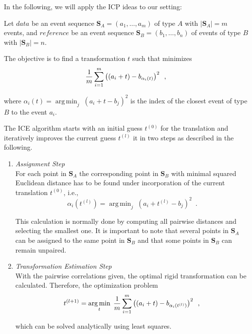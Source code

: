 \documentclass[conference]{IEEEtran}
\theoremstyle{examplestyle}
\DeclareMathOperator*{\argmin}{arg\,min}
\begin{document}
In the following, we will apply the ICP ideas to our setting:

Let \(data\) be  an event sequence \(\pmb{S}_A = (a_1,\ldots, a_m)\)   of type \(A\) with \(|\pmb{S}_A| = m\) events,  and \(reference\) be an event sequence \(\pmb{S}_B=(b_1,\ldots, b_n)\)  of events of type \(B\) with \(|\pmb{S}_B| = n\).

The objective is to find a transformation $t$ such that minimizes 
\begin{equation}
 \dfrac{1}{m} \sum_{i = 1}^{m} \left( (a_i + t) - b_{\alpha_i(t)} \right)^2 \enspace , \\
\end{equation}

where $\alpha_i(t)= \argmin_j \; (a_i+t-b_j)^2$ is the index of the closest event of type  $B$  to the event $a_i$.

The \acl{ICE} algorithm starts with an initial guess $t^{(0)}$ for the translation and iteratively improves the current guess $t^{(l)}$ it in two steps as described in the following.

\begin{enumerate}
 \item \emph{Assignment Step}\\
For each point in \(\pmb{S}_A\) the corresponding point in \(\pmb{S}_B\) with minimal squared Euclidean distance has to be found under incorporation of the current translation $t^{(0)}$, i.e., 
\begin{equation}
\alpha_i(t^{(l)})= \argmin_j \;  (a_i+t^{(l)}-b_j)^2  \enspace .
\end{equation}


This calculation is normally done by computing all pairwise distances and selecting the smallest one. It is important to note that several points in \(\pmb{S}_A\) can be assigned to the same point in \(\pmb{S}_B\) and that some points in \(\pmb{S}_B\) can remain unpaired.  



\item  \emph{Transformation Estimation Step}\\
With the pairwise correlations given, the optimal rigid transformation can be calculated. Therefore, the optimization problem
\begin{equation}
t^{(l+1)}= \argmin_{t} \;  \dfrac{1}{m} \sum_{i = 1}^{m} \left( (a_i + t) - b_{\alpha_i(t^{(l)})} \right)^2 \enspace , \\
\end{equation}

 which can be solved analytically using least squares.

\end{enumerate}
\end{document}

